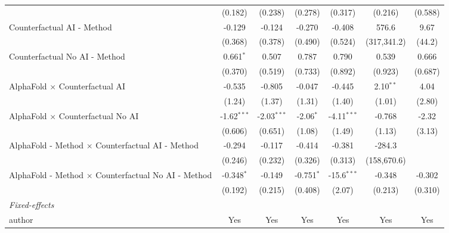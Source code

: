 \begin{tabular}{lcccccc}
                                                              & (0.182)       & (0.238)       & (0.278)      & (0.317)       & (0.216)     & (0.588)\\   
   Counterfactual AI - Method                                 & -0.129        & -0.124        & -0.270       & -0.408        & 576.6       & 9.67\\   
                                                              & (0.368)       & (0.378)       & (0.490)      & (0.524)       & (317,341.2) & (44.2)\\   
   Counterfactual No AI - Method                              & 0.661$^{*}$   & 0.507         & 0.787        & 0.790         & 0.539       & 0.666\\   
                                                              & (0.370)       & (0.519)       & (0.733)      & (0.892)       & (0.923)     & (0.687)\\   
   AlphaFold $\times$ Counterfactual AI                       & -0.535        & -0.805        & -0.047       & -0.445        & 2.10$^{**}$ & 4.04\\   
                                                              & (1.24)        & (1.37)        & (1.31)       & (1.40)        & (1.01)      & (2.80)\\   
   AlphaFold $\times$ Counterfactual No AI                    & -1.62$^{***}$ & -2.03$^{***}$ & -2.06$^{*}$  & -4.11$^{***}$ & -0.768      & -2.32\\   
                                                              & (0.606)       & (0.651)       & (1.08)       & (1.49)        & (1.13)      & (3.13)\\   
   AlphaFold - Method $\times$ Counterfactual AI - Method     & -0.294        & -0.117        & -0.414       & -0.381        & -284.3      &   \\   
                                                              & (0.246)       & (0.232)       & (0.326)      & (0.313)       & (158,670.6) &   \\   
   AlphaFold - Method $\times$ Counterfactual No AI - Method  & -0.348$^{*}$  & -0.149        & -0.751$^{*}$ & -15.6$^{***}$ & -0.348      & -0.302\\   
                                                              & (0.192)       & (0.215)       & (0.408)      & (2.07)        & (0.213)     & (0.310)\\   
   \midrule
   \emph{Fixed-effects}\\
   author                                                     & Yes           & Yes           & Yes          & Yes           & Yes         & Yes\\  

\end{tabular}
